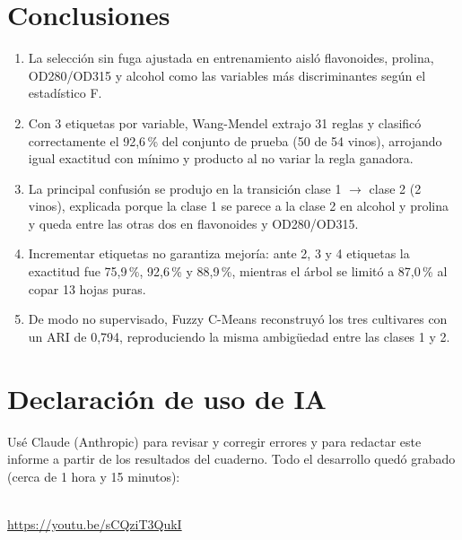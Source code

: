 \documentclass[11pt,letterpaper]{article}
\begin{document}
\section{Conclusiones}

\begin{enumerate}
\item La selección sin fuga ajustada en entrenamiento aisló flavonoides, prolina, OD280/OD315 y alcohol como las variables más discriminantes según el estadístico F.
\item Con 3 etiquetas por variable, Wang-Mendel extrajo 31 reglas y clasificó correctamente el 92,6\,\% del conjunto de prueba (50 de 54 vinos), arrojando igual exactitud con mínimo y producto al no variar la regla ganadora.
\item La principal confusión se produjo en la transición clase 1 $\to$ clase 2 (2 vinos), explicada porque la clase 1 se parece a la clase 2 en alcohol y prolina y queda entre las otras dos en flavonoides y OD280/OD315.
\item Incrementar etiquetas no garantiza mejoría: ante 2, 3 y 4 etiquetas la exactitud fue 75,9\,\%, 92,6\,\% y 88,9\,\%, mientras el árbol se limitó a 87,0\,\% al copar 13 hojas puras.
\item De modo no supervisado, Fuzzy C-Means reconstruyó los tres cultivares con un ARI de 0,794, reproduciendo la misma ambigüedad entre las clases 1 y 2.
\end{enumerate}

\section{Declaración de uso de IA}\label{sec:ia}

Usé Claude (Anthropic) para revisar y corregir errores y para redactar este informe a partir de los resultados del cuaderno. Todo el desarrollo quedó grabado (cerca de 1 hora y 15 minutos):

\begin{center}
\\[0.6em]
\url{https://youtu.be/sCQziT3QukI}
\end{center}
\end{document}
